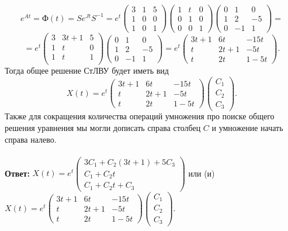 \documentclass[a4paper, 12pt]{article}
\newcommand{\FI}{\text{Ф}}
\begin{document}
$$e^{At} = \FI(t) = Se^{Jt}S^{-1} = e^t\begin{pmatrix}
	3 & 1 & 5\\
	1 & 0 & 0\\
	1 & 0 & 1
\end{pmatrix}\begin{pmatrix}
1 & t & 0\\
0 & 1 & 0\\
0 & 0 & 1
\end{pmatrix}\begin{pmatrix}
0 & 1 & 0\\
1 & 2 & -5\\
0 & -1 & 1
\end{pmatrix}=$$ $$= e^t\begin{pmatrix}
3 & 3t+ 1 & 5\\
1 & t & 0\\
1 & t & 1\\
\end{pmatrix}\begin{pmatrix}
0 & 1 & 0\\
1 & 2 & -5\\
0 & -1 & 1
\end{pmatrix}=e^t\begin{pmatrix}
3t+1 & 6t& -15t\\
t & 2t + 1& -5t\\
t & 2t & 1 - 5t
\end{pmatrix}.$$
Тогда общее решение СтЛВУ будет иметь вид
$$X(t) = e^t\begin{pmatrix}
	3t+1 & 6t& -15t\\
	t & 2t + 1& -5t\\
	t & 2t & 1 - 5t
\end{pmatrix}\begin{pmatrix}
C_1\\C_2\\C_3
\end{pmatrix}.$$
Также для сокращения количества операций умножения про поиске общего решения уравнения мы могли дописать справа столбец $C$ и умножение начать справа налево.\\\\
\textbf{Ответ:} $X(t) = e^t\begin{pmatrix}
	3C_1 + C_2(3t+1) + 5C_3\\
	C_1 + C_2t\\
	C_1 + C_2t + C_3
\end{pmatrix}$ или (и) $X(t) = e^t\begin{pmatrix}
	3t+1 & 6t& -15t\\
	t & 2t + 1& -5t\\
	t & 2t & 1 - 5t
\end{pmatrix}\begin{pmatrix}
	C_1\\C_2\\C_3
\end{pmatrix}.$\\\\
\end{document}
